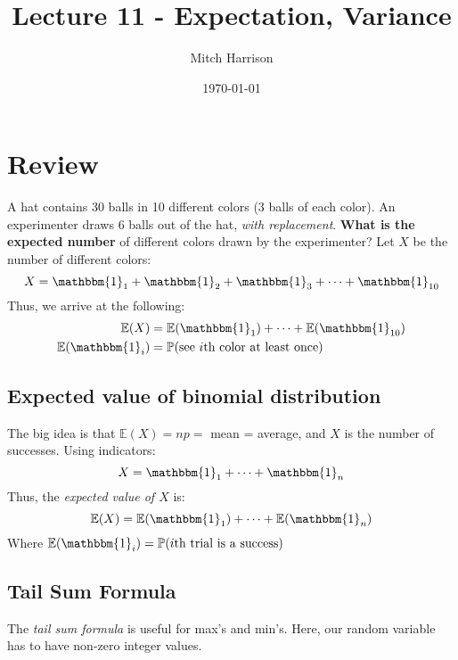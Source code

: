 \documentclass[titlepage, 12pt, leqno]{article}
\title{\Huge{Lecture 11 - Expectation, Variance}}
\author{\large{Mitch Harrison}}
\date{\today}
\begin{document}
\setlength{\parskip}{1\baselineskip}
\setlength{\parindent}{15pt}
\maketitle
\tableofcontents
\newpage


\section{Review}
\begin{ex}
    A hat contains 30 balls in 10 different colors (3 balls of each color). An
    experimenter draws 6 balls out of the hat, \textit{with replacement}. 
    \textbf{What is the expected number} of different colors drawn by the 
    experimenter?
    \vspace{10px}
    Let $X$ be the number of different colors:
    \[
        X = \mathbbm{1}_1 + \mathbbm{1}_{2} + \mathbbm{1}_{3} + \cdots +
        \mathbbm{1}_{10}
    \]
    Thus, we arrive at the following:
   \begin{align*}
       \mathbb{E}(X) &= \mathbb{E}( \mathbbm{1}_{1}) + \cdots + \mathbb{E}(
   \mathbbm{1}_{10}) \\
       \mathbb{E}( \mathbbm{1}_{i}) &= \mathbb{P}( \text{see $i$th color at least
       once}) 
   \end{align*}
\end{ex}

\pagebreak
\subsection{Expected value of binomial distribution}
The big idea is that $ \mathbb{E}(X) = np = $ mean = average, and $X$ is the 
number of successes. Using indicators:
\[
    X = \mathbbm{1}_{1} + \cdots + \mathbbm{1}_{n}
\]
Thus, the \textit{expected value of $X$} is:
\[
    \mathbb{E}(X) = \mathbb{E}( \mathbbm{1}_{1}) + \cdots + \mathbb{E}( 
    \mathbbm{1}_{n})
\]
Where $ \mathbb{E}( \mathbbm{1}_{i}) = \mathbb{P}( i\text{th trial is a 
success})$ 

\subsection{Tail Sum Formula}
The \textit{tail sum formula} is useful for max's and min's. Here, our random
variable has to have non-zero integer values.
\end{document}
